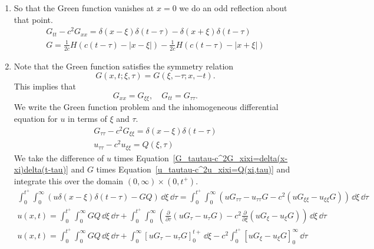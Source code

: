 {\begin{Solution}
  \begin{enumerate}
  \item
    So that the Green function vanishes at $x = 0$ we do an odd reflection
    about that point.
    \begin{gather*}
      G_{t t} - c^2 G_{x x} = \delta(x - \xi) \delta(t - \tau)
      - \delta(x + \xi) \delta(t - \tau) \\
      G = \frac{1}{2c} H(c (t-\tau) - |x - \xi| )
      - \frac{1}{2c} H(c (t-\tau) - |x + \xi| )
    \end{gather*}
  \item
    Note that the Green function satisfies the symmetry relation
    \[
    G(x,t;\xi,\tau) = G(\xi,-\tau; x,-t).
    \]
    This implies that
    \[
    G_{x x} = G_{\xi \xi}, \quad G_{t t} = G_{\tau \tau}.
    \]
    We write the Green function problem and the inhomogeneous differential
    equation for $u$ in terms of $\xi$ and $\tau$.
    \begin{gather}
      \label{G_tautau-c^2G_xixi=delta(x-xi)delta(t-tau)}
      G_{\tau \tau} - c^2 G_{\xi \xi} = \delta(x-\xi) \delta(t-\tau) \\
      \label{u_tautau-c^2u_xixi=Q(xi,tau)}
      u_{\tau \tau} - c^2 u_{\xi \xi} = Q(\xi, \tau)
    \end{gather}
    We take the difference of $u$ times 
    Equation~\ref{G_tautau-c^2G_xixi=delta(x-xi)delta(t-tau)}
    and $G$ times Equation~\ref{u_tautau-c^2u_xixi=Q(xi,tau)}
    and integrate this over the domain $(0,\infty) \times (0,t^+)$.
    \begin{gather*}
      \int_0^{t^+} \int_0^\infty \left( u \delta(x-\xi) \delta(t-\tau) - G Q 
      \right) \,\dd \xi \,\dd \tau
      = \int_0^{t^+} \int_0^\infty \left( 
        u G_{\tau \tau} - u_{\tau \tau} G
        - c^2 \left( u G_{\xi \xi} - u_{\xi \xi} G \right) \right)
      \,\dd \xi \,\dd \tau \\
      u(x,t) = \int_0^{t^+} \int_0^\infty G Q \,\dd \xi \,\dd \tau
      + \int_0^{t^+} \int_0^\infty \left( 
        \frac{\partial}{\partial \tau} \left( u G_{\tau} - u_{\tau} G \right)
        - c^2 \frac{\partial}{\partial \xi} \left( u G_\xi - u_\xi G \right)
      \right) \,\dd \xi \,\dd \tau \\
      u(x,t) = \int_0^{t^+} \int_0^\infty G Q \,\dd \xi \,\dd \tau
      + \int_0^\infty \left[ u G_{\tau} - u_{\tau} G \right]_0^{t+} \,\dd \xi
      - c^2 \int_0^{t^+} \left[ u G_\xi - u_\xi G \right]_0^\infty \,\dd \tau \\

\end{gather*}
\end{enumerate}
\end{Solution}}
